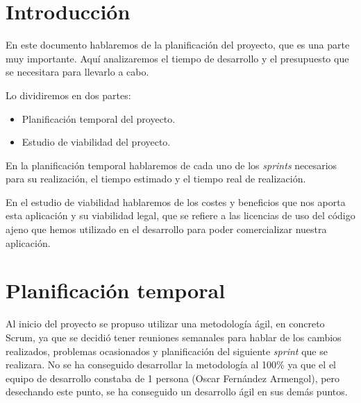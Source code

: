 
\section{Introducción}

En este documento hablaremos de la planificación del proyecto, que es una parte muy importante. Aquí analizaremos el tiempo de desarrollo y el presupuesto que se necesitara para llevarlo a cabo.

Lo dividiremos en dos partes:

\begin{itemize}
	\tightlist
	\item
	Planificación temporal del proyecto.
	\item
	Estudio de viabilidad del proyecto.
\end{itemize}

En la planificación temporal hablaremos de cada uno de los \emph{sprints} necesarios para su realización, el tiempo estimado y el tiempo real de realización.

En el estudio de viabilidad hablaremos de los costes y beneficios que nos aporta esta aplicación y su viabilidad legal, que se refiere a las licencias de uso del código ajeno que hemos utilizado en el desarrollo para poder comercializar nuestra aplicación.

\section{Planificación temporal}

Al inicio del proyecto se propuso utilizar una metodología ágil, en concreto Scrum, ya que se decidió tener reuniones semanales para hablar de los cambios realizados, problemas ocasionados y planificación del siguiente \emph{sprint} que se realizara. No se ha conseguido desarrollar la metodología al 100\% ya que el el equipo de desarrollo constaba de 1 persona (Oscar Fernández Armengol), pero desechando este punto, se ha conseguido un desarrollo ágil en sus demás puntos. 

